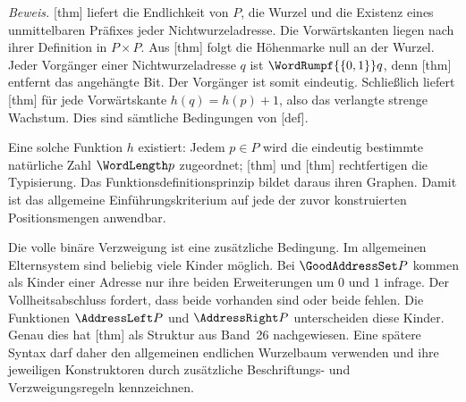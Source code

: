 \noindent\begin{minipage}{\linewidth}
\end{minipage}\par
\noindent\textit{Beweis.}
[thm] liefert die
Endlichkeit von \(P\), die Wurzel und die Existenz eines unmittelbaren
Präfixes jeder Nichtwurzeladresse. Die Vorwärtskanten liegen nach ihrer
Definition in \(P\times P\). Aus
[thm] folgt die Höhenmarke null
an der Wurzel. Jeder Vorgänger einer Nichtwurzeladresse \(q\) ist
\(\WordRumpf{\{0,1\}}q\), denn
[thm] entfernt das angehängte Bit.
Der Vorgänger ist somit eindeutig. Schließlich liefert
[thm] für jede Vorwärtskante
\(h(q)=h(p)+1\), also das verlangte strenge Wachstum. Dies sind
sämtliche Bedingungen von
[def].

Eine solche Funktion \(h\) existiert: Jedem \(p\in P\) wird die
eindeutig bestimmte natürliche Zahl \(\WordLength p\) zugeordnet;
[thm] und
[thm] rechtfertigen die
Typisierung. Das Funktionsdefinitionsprinzip bildet daraus ihren Graphen.
Damit ist das allgemeine Einführungskriterium auf jede der zuvor
konstruierten Positionsmengen anwendbar.

Die volle binäre Verzweigung ist eine zusätzliche Bedingung. Im
allgemeinen Elternsystem sind beliebig viele Kinder möglich. Bei
\(\GoodAddressSet P\) kommen als Kinder einer Adresse nur ihre beiden
Erweiterungen um \(0\) und \(1\) infrage. Der Vollheitsabschluss
fordert, dass beide vorhanden sind oder beide fehlen. Die Funktionen
\(\AddressLeft P\) und \(\AddressRight P\) unterscheiden diese Kinder.
Genau dies hat
[thm] als
Struktur aus Band~26 nachgewiesen. Eine spätere Syntax darf daher
den allgemeinen endlichen Wurzelbaum verwenden und ihre jeweiligen
Konstruktoren durch zusätzliche Beschriftungs- und Verzweigungsregeln
kennzeichnen.
